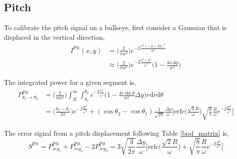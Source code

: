 \begin{appendices}
	\subsection{Pitch}
	To calibrate the pitch signal on a bullseye, first consider a Gaussian that is displaced in the vertical direction,
	\begin{equation}
	\begin{split}
	I^{\text{Pit}}(x,y) 	&= 			\bigg(\frac{2}{\pi w^2}\bigg) e^{-2 \frac{x^2 + (y+\Delta y)^2}{w^2}}\\
					&\approx	\bigg(\frac{2}{\pi w^2}\bigg) e^{-2 \frac{x^2 + y^2}{\omega^2}}  \bigg(1-\frac{4 x \Delta y}{w^2}\bigg)
	\end{split}
	\end{equation}
	
	The integrated power for a given segment is,
	\begin{equation}
	\begin{split}
	P^{\text{Pit}}_{\theta_1 \rightarrow \theta_2} 	&=  \bigg(\frac{2}{\pi w^2}\bigg) \int_{R}^{\infty} \int_{\theta_1}^{\theta_2} e^{-2 \frac{r^2}{\omega^2}}  \bigg(1-\frac{4 r \sin \theta}{w^2}\Delta y\bigg) r \text{d}r \text{d} \theta\\
		&= \bigg( \frac{\theta_2-\theta_1}{2 \pi}\bigg) e^{-2 \frac{R^2}{\omega^2}} + (\cos \theta_2 - \cos \theta_1) \frac{1}{\sqrt{2 \pi}} \frac{\Delta y}{\omega} \bigg[ 	  \text{erfc} \bigg(\frac{\sqrt{2} R}{\omega}\bigg) \sqrt{\frac{8}{\pi}} \frac{R}{\omega} e^{-2 \frac{R^2}{\omega^2}}\bigg]
	\end{split}
	\end{equation}
	
	The error signal from a pitch displacement following Table \ref{bpd_matrix} is,
	\begin{equation}
	S^{\text{Pit}} = P^{\text{Pit}}_{seg_1} + P^{\text{Pit}}_{seg_2} - 2 P^{\text{Pit}}_{seg_3} = 3\sqrt{\frac{3}{2\pi}} \frac{\Delta y}{\omega} \bigg[ \text{erfc} \bigg(\frac{\sqrt{2} R}{\omega}\bigg) + \sqrt{\frac{8}{\pi }} \frac{R}{\omega} e^{-2 \frac{R^2}{\omega^2}} \bigg]
 	\end{equation}


\end{appendices}
